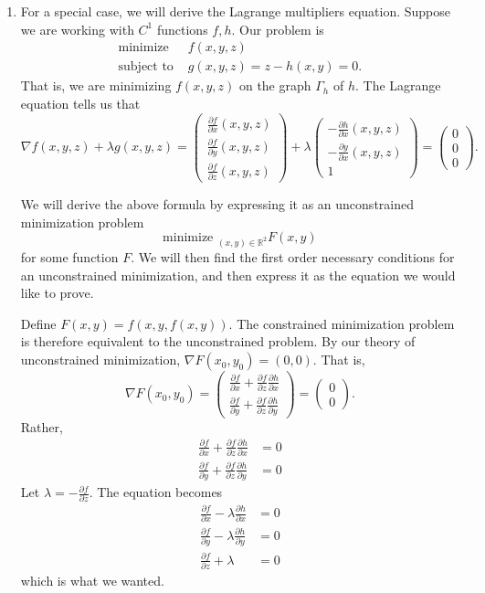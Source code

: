 \documentclass[11pt]{book}
\newcommand{\R}{\mathbb{R}}
\newcommand{\pd}{\partial}
\begin{document}
\begin{enumerate}
\item
For a special case, we will derive the Lagrange multipliers equation. Suppose we are working with $C^1$ functions $f,h$. Our problem is
\begin{align*}
\text{minimize } &f(x,y,z) \\
\text{subject to } &g(x,y,z) = z-h(x,y) = 0.
\end{align*}
That is, we are minimizing $f(x,y,z)$ on the graph $\Gamma_h$ of $h$. The Lagrange equation tells us that
\[
\nabla f(x,y,z) + \lambda g(x,y,z) = \begin{pmatrix}
\frac{\pd f}{\pd x}(x,y,z) \\ \frac{\pd f}{\pd y}(x,y,z) \\ \frac{\pd f}{\pd z}(x,y,z)
\end{pmatrix} + \lambda \begin{pmatrix}
-\frac{\pd h}{\pd x}(x,y,z) \\ -\frac{\pd y}{\pd x}(x,y,z) \\ 1
\end{pmatrix} = \begin{pmatrix}
0 \\ 0 \\ 0
\end{pmatrix}.
\]

We will derive the above formula by expressing it as an unconstrained minimization problem
\[ 
\text{minimize }_{(x,y) \in \R^2} F(x,y)
\]
for some function $F$. We will then find the first order necessary conditions for an unconstrained minimization, and then express it as the equation we would like to prove.

Define $F(x,y) = f(x,y,f(x,y))$. The constrained minimization problem is therefore equivalent to the unconstrained problem. By our theory of unconstrained minimization, $\nabla F(x_0,y_0)=(0,0)$. That is,
\[
\nabla F(x_0,y_0) = \begin{pmatrix}
\frac{\pd f}{\pd x} + \frac{\pd f}{\pd z}\frac{\pd h}{\pd x} \\
\frac{\pd f}{\pd y} + \frac{\pd f}{\pd z}\frac{\pd h}{\pd y}
\end{pmatrix} = \begin{pmatrix}
0\\0
\end{pmatrix}.
\]
Rather,
\begin{align*}
\frac{\pd f}{\pd x} + \frac{\pd f}{\pd z}\frac{\pd h}{\pd x} &= 0 \\
\frac{\pd f}{\pd y} + \frac{\pd f}{\pd z}\frac{\pd h}{\pd y} &= 0
\end{align*}
Let $\lambda = -\frac{\pd f}{\pd z}$. The equation becomes
\begin{align*}
\frac{\pd f}{\pd x} - \lambda \frac{\pd h}{\pd x} &= 0 \\
\frac{\pd f}{\pd y} - \lambda \frac{\pd h}{\pd y} &= 0 \\
\frac{\pd f}{\pd z} + \lambda &= 0
\end{align*}
which is what we wanted.
\end{enumerate}
\end{document}
